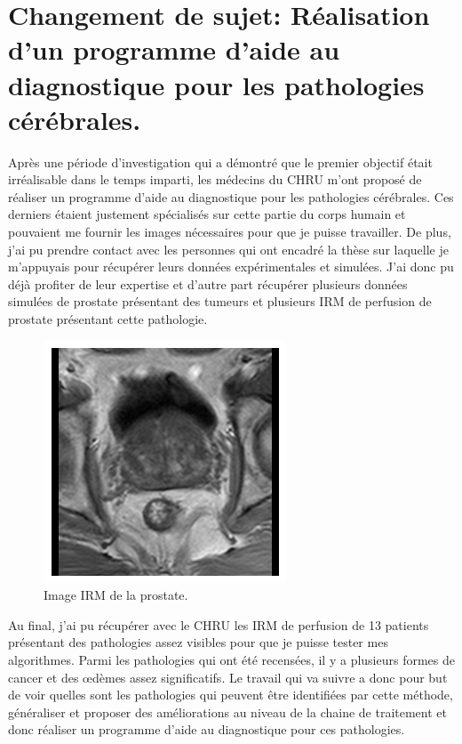\chapter{Changement de sujet: Réalisation d'un programme d'aide au diagnostique pour les pathologies cérébrales.}


Après une période d'investigation qui a démontré que le premier objectif était irréalisable dans le temps imparti, les médecins du CHRU m'ont proposé de réaliser un programme d'aide au diagnostique pour les pathologies cérébrales. Ces derniers étaient justement spécialisés sur cette partie du corps humain et pouvaient me fournir les images nécessaires pour que je puisse travailler. 
De plus, j'ai pu prendre contact avec les personnes qui ont encadré la thèse sur laquelle je m'appuyais pour récupérer leurs données expérimentales et simulées. J'ai donc pu déjà profiter de leur expertise et d'autre part récupérer plusieurs données simulées de prostate présentant des tumeurs et plusieurs IRM de perfusion de prostate présentant cette pathologie.

\begin{figure}[H]
\centering
    \includegraphics[scale=1,angle=0]{Images/ProstateImage.png}
    \caption{Image IRM de la prostate.}
    \label{fig:ProstateImage}
\end{figure}

Au final, j'ai pu récupérer avec le CHRU les IRM de perfusion de 13 patients présentant des pathologies assez visibles pour que je puisse tester mes algorithmes. Parmi les pathologies qui ont été recensées, il y a plusieurs formes de cancer et des œdèmes assez significatifs. Le travail qui va suivre a donc pour but de voir quelles sont les pathologies qui peuvent être identifiées par cette méthode, généraliser et proposer des améliorations au niveau de la chaine de traitement et donc réaliser un programme d'aide au diagnostique pour ces pathologies.




